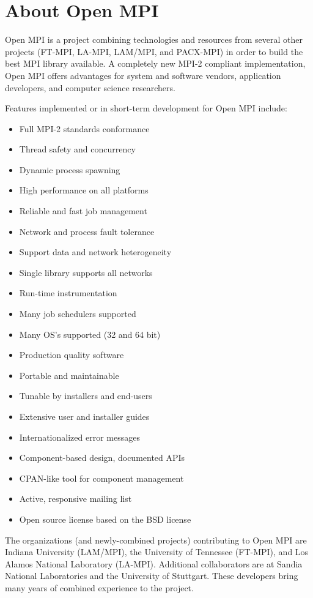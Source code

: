 
\section{About Open MPI}

Open MPI is a project combining technologies and resources from
several other projects (FT-MPI, LA-MPI, LAM/MPI, and PACX-MPI) in
order to build the best MPI library available.  A completely new MPI-2
compliant implementation, Open MPI offers advantages for system and
software vendors, application developers, and computer science
researchers.

Features implemented or in short-term development for Open MPI
include:

\begin{itemize}
\item Full MPI-2 standards conformance
\item Thread safety and concurrency
\item Dynamic process spawning
\item High performance on all platforms
\item Reliable and fast job management
\item Network and process fault tolerance
\item Support data and network heterogeneity
\item Single library supports all networks
\item Run-time instrumentation
\item Many job schedulers supported
\item Many OS's supported (32 and 64 bit)
\item Production quality software
\item Portable and maintainable
\item Tunable by installers and end-users
\item Extensive user and installer guides
\item Internationalized error messages
\item Component-based design, documented APIs
\item CPAN-like tool for component management
\item Active, responsive mailing list
\item Open source license based on the BSD license
\end{itemize}

The organizations (and newly-combined projects) contributing to Open
MPI are Indiana University (LAM/MPI), the University of Tennessee
(FT-MPI), and Los Alamos National Laboratory (LA-MPI). Additional
collaborators are at Sandia National Laboratories and the University
of Stuttgart. These developers bring many years of combined experience
to the project.

